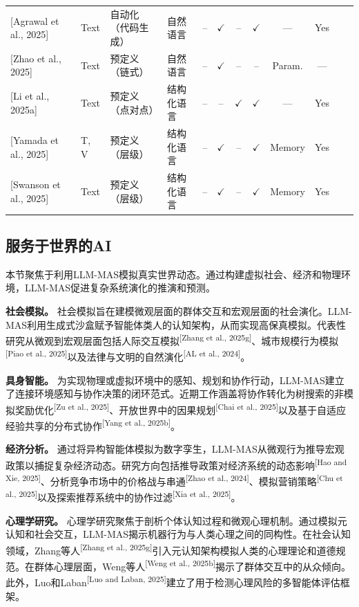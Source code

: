 \documentclass[UTF8,a4paper,12pt]{article}
\def\yes{$\checkmark$}
\def\no{--}
\begin{document}
\begin{table}[htbp]
\begin{tabular}{p{2.4cm}p{1.5cm}p{2.2cm}p{1.8cm}ccccccp{1.2cm}c}
{[}Agrawal et al., 2025{]} & Text & 自动化（代码生成） & 自然语言 & \no & \yes & \no & \yes & --- & Yes \\
{[}Zhao et al., 2025{]} & Text & 预定义（链式） & 自然语言 & \no & \yes & \no & \no & Param. & --- \\
{[}Li et al., 2025a{]} & Text & 预定义（点对点） & 结构化语言 & \no & \no & \yes & \yes & --- & Yes \\
{[}Yamada et al., 2025{]} & T, V & 预定义（层级） & 结构化语言 & \no & \yes & \no & \yes & Memory & Yes \\
{[}Swanson et al., 2025{]} & Text & 预定义（层级） & 结构化语言 & \no & \yes & \no & \yes & Memory & Yes \\
\bottomrule
\end{tabular}
\end{table}

\subsection{服务于世界的AI}

本节聚焦于利用LLM-MAS模拟真实世界动态。通过构建虚拟社会、经济和物理环境，LLM-MAS促进复杂系统演化的推演和预测。

\textbf{社会模拟。} 社会模拟旨在建模微观层面的群体交互和宏观层面的社会演化。LLM-MAS利用生成式沙盒赋予智能体类人的认知架构，从而实现高保真模拟。代表性研究从微观到宏观层面包括人际交互模拟\textsuperscript{[Zhang et al., 2025g]}、城市规模行为模拟\textsuperscript{[Piao et al., 2025]}以及法律与文明的自然演化\textsuperscript{[AL et al., 2024]}。

\textbf{具身智能。} 为实现物理或虚拟环境中的感知、规划和协作行动，LLM-MAS建立了连接环境感知与协作决策的闭环范式。近期工作涵盖将协作转化为树搜索的非模拟奖励优化\textsuperscript{[Zu et al., 2025]}、开放世界中的因果规划\textsuperscript{[Chai et al., 2025]}以及基于自适应经验共享的分布式协作\textsuperscript{[Yang et al., 2025b]}。

\textbf{经济分析。} 通过将异构智能体模拟为数字孪生，LLM-MAS从微观行为推导宏观政策以捕捉复杂经济动态。研究方向包括推导政策对经济系统的动态影响\textsuperscript{[Hao and Xie, 2025]}、分析竞争市场中的价格战与串通\textsuperscript{[Zhao et al., 2024]}、模拟营销策略\textsuperscript{[Chu et al., 2025]}以及探索推荐系统中的协作过滤\textsuperscript{[Xia et al., 2025]}。

\textbf{心理学研究。} 心理学研究聚焦于剖析个体认知过程和微观心理机制。通过模拟元认知和社会交互，LLM-MAS揭示机器行为与人类心理之间的同构性。在社会认知领域，Zhang等人\textsuperscript{[Zhang et al., 2025g]}引入元认知架构模拟人类的心理理论和道德规范。在群体心理层面，Weng等人\textsuperscript{[Weng et al., 2025b]}揭示了群体交互中的从众倾向。此外，Luo和Laban\textsuperscript{[Luo and Laban, 2025]}建立了用于检测心理风险的多智能体评估框架。
\end{document}
